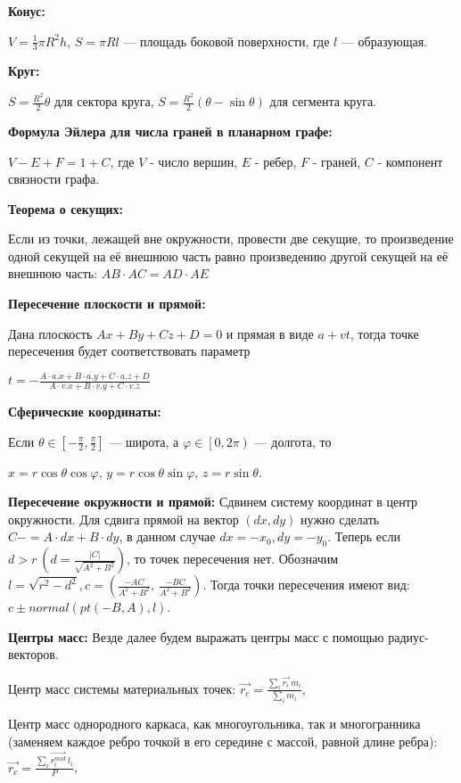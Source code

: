 \textbf{Конус:}

$V=\frac{1}{3}\pi R^2 h$,
$S=\pi Rl$ --- площадь боковой поверхности, где $l$ --- образующая.

\textbf{Круг:}

$S=\frac{R^2}{2}\theta$ для сектора круга,
$S=\frac{R^2}{2}(\theta - \sin\theta)$ для сегмента круга.

\textbf{Формула Эйлера для числа граней в планарном графе:}

$V-E+F=1+C$, где $V$ - число вершин, $E$ - ребер, $F$ - граней, $C$ - компонент связности графа.

\textbf{Теорема о секущих:}

Если из точки, лежащей вне окружности, провести две секущие, то произведение одной секущей на её внешнюю часть равно произведению другой секущей на её внешнюю часть:
$AB\cdot AC=AD\cdot AE$

\textbf{Пересечение плоскости и прямой:}

Дана плоскость $Ax+By+Cz+D=0$ и прямая в виде $a+vt$, тогда точке пересечения будет соответствовать параметр

$t=-\frac{A \cdot a.x+B \cdot a.y+C \cdot a.z+D}{A \cdot v.x+B \cdot v.y+C \cdot v.z}$

\textbf{Сферические координаты:}

Если $\theta\in \left [ -\frac{\pi}{2}, \frac{\pi}{2} \right ]$ --- широта, а
$\varphi\in \left [ 0, 2\pi \right )$ --- долгота, то

$x=r\cos\theta \cos\varphi$,
$y=r\cos\theta \sin\varphi$,
$z=r\sin\theta$.

\textbf{Пересечение окружности и прямой:}
Сдвинем систему координат в центр окружности. Для сдвига прямой на вектор $(dx, dy)$ нужно сделать $C -= A \cdot dx + B \cdot dy$,
в данном случае $dx = -x_0, dy = -y_0$. Теперь если $d > r\ (d=\frac{|C|}{\sqrt{A^2+B^2}})$, то точек пересечения нет.
Обозначим $l=\sqrt{r^2-d^2}, c = (\frac{-AC}{A^2+B^2},\ \frac{-BC}{A^2+B^2})$. Тогда точки пересечения имеют вид:
$c \pm normal(pt(-B, A), l)$.

\textbf{Центры масс:}
Везде далее будем выражать центры масс с помощью радиус-векторов.

Центр масс системы материальных точек: $\vec{r_c}=\frac{\sum \limits_{i} \vec{r_i}\ m_i}{\sum \limits_{i} m_i}$,

Центр масс однородного каркаса, как многоугольника, так и многогранника (заменяем каждое ребро точкой в его середине с массой, равной длине ребра):
$\vec{r_c}=\frac{\sum \limits_{i} \vec{r_{i}^{mid}}\ l_i}{P}$,

